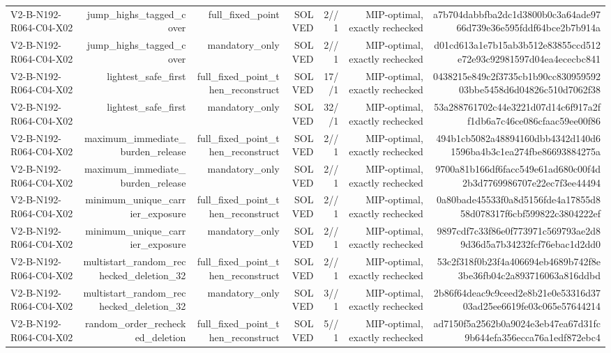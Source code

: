 {\begin{longtable}{lrrrrrr}
V2-B-N192-R064-C04-X02 & jump\_highs\_tagged\_cover & full\_fixed\_point & SOLVED & 2//1 & MIP-optimal, exactly rechecked & a7b704dabbfba2dc1d3800b0c3a64ade9766d739e36e595fddf64bce2b7b914a \\
V2-B-N192-R064-C04-X02 & jump\_highs\_tagged\_cover & mandatory\_only & SOLVED & 2//1 & MIP-optimal, exactly rechecked & d01cd613a1e7b15ab3b512e83855ccd512e72e93c92981597d04ea4ececbc841 \\
V2-B-N192-R064-C04-X02 & lightest\_safe\_first & full\_fixed\_point\_then\_reconstruct & SOLVED & 17//1 & MIP-optimal, exactly rechecked & 0438215e849c2f3735cb1b90cc83095959203bbe5458d6d04826c510d7062f38 \\
V2-B-N192-R064-C04-X02 & lightest\_safe\_first & mandatory\_only & SOLVED & 32//1 & MIP-optimal, exactly rechecked & 53a288761702c44e3221d07d14c6f917a2ff1db6a7c46ce086cfaac59ee00f86 \\
V2-B-N192-R064-C04-X02 & maximum\_immediate\_burden\_release & full\_fixed\_point\_then\_reconstruct & SOLVED & 2//1 & MIP-optimal, exactly rechecked & 494b1cb5082a48894160dbb4342d140d61596ba4b3c1ea274fbe86693884275a \\
V2-B-N192-R064-C04-X02 & maximum\_immediate\_burden\_release & mandatory\_only & SOLVED & 2//1 & MIP-optimal, exactly rechecked & 9700a81b166df6facc549e61ad680c00f4d2b3d7769986707e22ec7f3ee44494 \\
V2-B-N192-R064-C04-X02 & minimum\_unique\_carrier\_exposure & full\_fixed\_point\_then\_reconstruct & SOLVED & 2//1 & MIP-optimal, exactly rechecked & 0a80bade45533f0a8d5156fde4a17855d858d078317f6cbf599822c3804222ef \\
V2-B-N192-R064-C04-X02 & minimum\_unique\_carrier\_exposure & mandatory\_only & SOLVED & 2//1 & MIP-optimal, exactly rechecked & 9897cdf7c33f86e0f773971c569793ae2d89d36d5a7b34232fcf76ebac1d2dd0 \\
V2-B-N192-R064-C04-X02 & multistart\_random\_rechecked\_deletion\_32 & full\_fixed\_point\_then\_reconstruct & SOLVED & 2//1 & MIP-optimal, exactly rechecked & 53c2f318f0b23f4a406694eb4689b742f8e3be36fb04c2a893716063a816ddbd \\
V2-B-N192-R064-C04-X02 & multistart\_random\_rechecked\_deletion\_32 & mandatory\_only & SOLVED & 3//1 & MIP-optimal, exactly rechecked & 2b86f64deac9c9ceed2e8b21e0e53316d3703ad25ee6619fe03c065e57644214 \\
V2-B-N192-R064-C04-X02 & random\_order\_rechecked\_deletion & full\_fixed\_point\_then\_reconstruct & SOLVED & 5//1 & MIP-optimal, exactly rechecked & ad7150f5a2562b0a9024e3eb47ea67d31fc9b644efa356ecca76a1edf872ebc4 \\

\end{longtable}}
